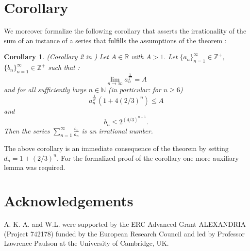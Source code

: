 \documentclass[11pt,a4paper]{article}
\newtheorem{corollary}{Corollary}%
\begin{document}
\section{Corollary}
We moreover formalize the following corollary that asserts the irrationality of the sum of an instance of a series that fulfills the assumptions of the theorem :

\begin{corollary} (Corollary 2 in \cite{hancl}) Let  $A \in \mathbb{R}$ with $A>1$. Let  $\{a_n \}^{\infty}_{n=1}  \in \mathbb{Z}^+$,
	$\{b_n \}^{\infty}_{n=1}  \in \mathbb{Z}^+$ such that :
	$$\lim_{n \rightarrow \infty} a_n^{\frac{1}{2^n}} = A  $$ and for all sufficiently  large $n \in \mathbb{N}$
	(in particular: for $n \geq 6$)
	$$a_n^{\frac{1}{2^n}} (1+ 4 (2/3)^n)  \leq A $$ and  $$b_n \leq 2^{(4/3)^{n-1}} .$$
	Then the series $\sum^{\infty}_{n=1} \frac{b_n}{a_n}$ is an irrational number.
\end{corollary}
The above corollary is an immediate consequence of the theorem by setting 
$d_n = 1 + (2/3)^n$. For the formalized proof of the corollary one more auxiliary lemma was required.



\section{Acknowledgements}
A. K.-A. and W.L. were supported by the ERC Advanced Grant ALEXANDRIA (Project 742178) funded by the European Research Council and led by Professor Lawrence Paulson at the University of Cambridge, UK.




\end{document}
